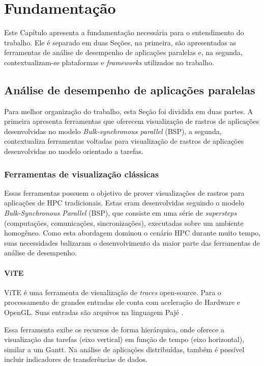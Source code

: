 
\chapter{Fundamentação} \label{ch:fundamentation}

Este Capítulo apresenta a fundamentação necessária para o entendimento do 
trabalho. Ele é separado em duas Seções, na primeira, são apresentadas as 
ferramentas de análise de desempenho de aplicações paralelas e, na segunda,
contextualizam-se plataformas e \emph{frameworks} utilizados no trabalho.

\section{Análise de desempenho de aplicações paralelas}

Para melhor organização do trabalho, esta Seção foi dividida em duas partes. A 
primeira apresenta ferramentas que oferecem visualização de rastros de 
aplicações desenvolvidas no modelo \emph{Bulk-synchronous parallel} (BSP), a 
segunda, contextualiza ferramentas voltadas para visualização de rastros de 
aplicações desenvolvidas no modelo orientado a tarefas.

\subsection{Ferramentas de visualização clássicas}

Essas ferramentas possuem o objetivo de prover visualizações de rastros para 
aplicações de HPC tradicionais. Estas eram desenvolvidas seguindo o modelo 
\emph{Bulk-Synchronous Parallel} (BSP), que consiste em uma série de 
\emph{supersteps} (computações, comunicações, sincronizações), executadas sobre 
um ambiente homogêneo. Como esta abordagem  dominou o cenário HPC durante muito 
tempo, suas necessidades balizaram o desenvolvimento da maior parte das 
ferramentas de análise de desempenho.

\subsubsection{ViTE}
ViTE \cite{ref:vite} é uma ferramenta de visualização de \emph{traces} 
open-source. Para o processamento de grandes entradas ele conta com aceleração 
de Hardware e OpenGL. Suas entradas são arquivos na linguagem Pajé 
\cite{ref:paje}.

Essa ferramenta exibe os recursos de forma hierárquica, onde oferece a 
visualização das tarefas (eixo vertical) em função de tempo (eixo horizontal), 
similar a um Gantt. Na análise de aplicações distribuídas, também é possível 
incluir indicadores de transferências de dados.


